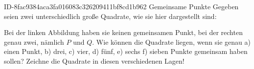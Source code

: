 \begin{exercise}
      {ID-8fac9384aca3fa016083c326209411bf8cd1b962}
      {Gemeinsame Punkte}
  \ifproblem\problem
    Gegeben seien zwei unterschiedlich große Quadrate, wie sie hier dargestellt
    sind:
    \begin{center}
    \end{center}
    Bei der linken Abbildung haben sie keinen gemeinsamen Punkt, bei der
    rechten genau zwei, nämlich $P$ und $Q$. Wie können die Quadrate liegen,
    wenn sie genau a) einen Punkt, b) drei, c) vier, d) fünf, e) sechs f) sieben
    Punkte gemeinsam haben sollen? Zeichne die Quadrate in diesen verschiedenen Lagen!
  \fi
\end{exercise}

